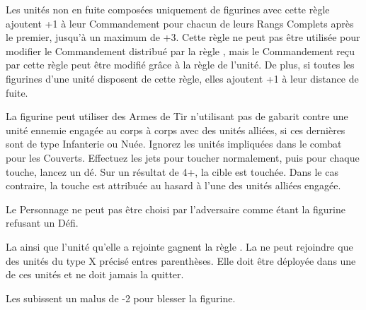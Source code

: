 \newcommand{\blackdeathrule}{%
La \catapult{} gagne\newline
[\multiplewounds{\ordnance}{}] et [+1 pour blesser].
}











\startarmyspecialrules

\armyspecialruleentry{\safetyinnumbers}

Les unités non en fuite composées uniquement de figurines avec cette règle ajoutent +1 à leur Commandement pour chacun de leurs Rangs Complets après le premier, jusqu'à un maximum de +3. Cette règle ne peut pas être utilisée pour modifier le Commandement distribué par la règle \inspiringpresence{}, mais le Commandement reçu par cette règle peut être modifié grâce à la règle \safetyinnumbers{} de l'unité. De plus, si toutes les figurines d'une unité disposent de cette règle, elles ajoutent +1 à leur distance de fuite.


\armyspecialruleentry{\callous}

La figurine peut utiliser des Armes de Tir n'utilisant pas de gabarit contre une unité ennemie engagée au corps à corps avec des unités alliées, si ces dernières sont de type Infanterie ou Nuée. Ignorez les unités impliquées dans le combat pour les Couverts. Effectuez les jets pour toucher normalement, puis pour chaque touche, lancez un dé. Sur un résultat de 4+, la cible est touchée. Dans le cas contraire, la touche est attribuée au hasard à l'une des unités alliées engagée.


\armyspecialruleentry{\honourless}

Le Personnage ne peut pas être choisi par l'adversaire comme étant la figurine refusant un Défi.



La \warplatform{} ainsi que l'unité qu'elle a rejointe gagnent la règle \immunetopsychology{}. La \warplatform{} ne peut rejoindre que des unités du type X précisé entres parenthèses. Elle doit être déployée dans une de ces unités et ne doit jamais la quitter.


\armyspecialruleentry{\resistant}

Les \toxicattacks{} subissent un malus de -2 pour blesser la figurine.



